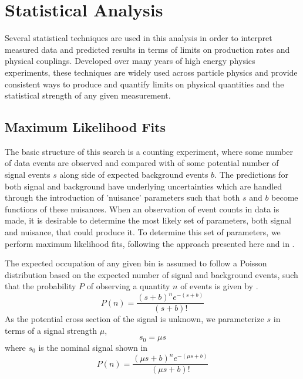 \chapter{Statistical Analysis}
\label{analysis_chapter}
Several statistical techniques are used in this analysis in order to interpret measured data and predicted results in terms of limits on production rates and physical couplings.
Developed over many years of high energy physics experiments, these techniques are widely used across particle physics and provide consistent ways to produce and quantify limits on physical quantities and the statistical strength of any given measurement.

\section{Maximum Likelihood Fits}
The basic structure of this search is a counting experiment, where some number of data events are observed and compared with of some potential number of signal events $s$ along side of expected background events $b$. 
The predictions for both signal and background have underlying uncertainties which are handled through the introduction of 'nuisance' parameters such that both $s$ and $b$ become functions of these nuisances.
When an observation of event counts in data is made, it is desirable to determine the most likely set of parameters, both signal and nuisance, that could produce it. 
To determine this set of parameters, we perform maximum likelihood fits, following the approach presented here and in \cite{conway2011}. 

The expected occupation of any given bin is assumed to follow a Poisson distribution based on the expected number of signal and background events, such that the probability $P$ of observing a quantity $n$ of events is given by .
\begin{equation}
	\label{eq:poisProb}
	P(n) = \frac{(s+b)^{n}e^{-(s+b)}}{(s+b)!}
\end{equation}
As the potential cross section of the signal is unknown, we parameterize $s$ in terms of a signal strength $\mu$,
\begin{equation}
	s_0 = \mu s
\end{equation}
where $s_0$ is the nominal signal shown in 
\begin{equation}
	P(n) = \frac{(\mu s+b)^{n}e^{-(\mu s+b)}}{(\mu s+b)!}
\end{equation}

